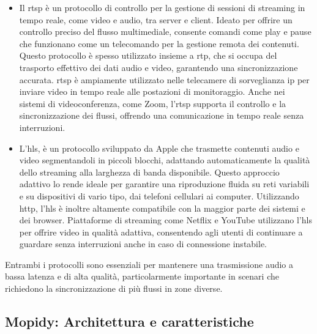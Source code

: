\begin{itemize}
    \item Il \gls{rtsp} è un protocollo di controllo per la gestione di sessioni di streaming in tempo reale, come video e audio, tra server e client. Ideato per offrire un controllo preciso del flusso multimediale, 
                              consente comandi come play e pause che funzionano come un telecomando per la gestione remota dei contenuti. Questo protocollo è spesso utilizzato insieme a \gls{rtp}, 
                                    che si occupa del trasporto effettivo dei dati audio e video, garantendo una sincronizzazione accurata.
                                          \gls{rtsp} è ampiamente utilizzato nelle telecamere di sorveglianza \gls{ip} per inviare video in tempo reale alle postazioni di monitoraggio. Anche nei sistemi di videoconferenza, 
                                                come Zoom, l'\gls{rtsp} supporta il controllo e la sincronizzazione dei flussi, offrendo una comunicazione in tempo reale senza interruzioni. \cite{s17040846}
          
    \item L'\gls{hls}, è un protocollo sviluppato da Apple che trasmette contenuti audio e video segmentandoli in piccoli blocchi, adattando automaticamente la qualità dello streaming alla larghezza di banda disponibile. 
                              Questo approccio adattivo lo rende ideale per garantire una riproduzione fluida su reti variabili e su dispositivi di vario tipo, dai telefoni cellulari ai computer. 
                                    Utilizzando \gls{http}, l'\gls{hls} è inoltre altamente compatibile con la maggior parte dei sistemi e dei browser.
                                          Piattaforme di streaming come Netflix e YouTube utilizzano l'\gls{hls} per offrire video in qualità adattiva, consentendo agli utenti di continuare a guardare senza interruzioni anche in caso di connessione instabile. \cite{flussonic2024}
  \end{itemize}

Entrambi i protocolli sono essenziali per mantenere una trasmissione audio a bassa latenza e di alta qualità, particolarmente importante in scenari che richiedono la sincronizzazione di più flussi in zone diverse. 

\subsection{Mopidy: Architettura e caratteristiche}
\noindent

